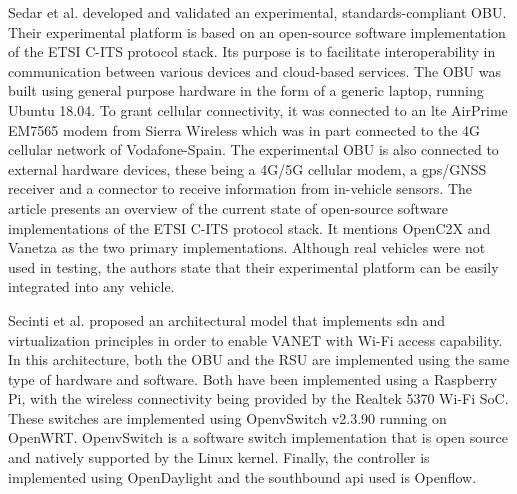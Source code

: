      
    Sedar et al.\cite{sedar_standards-compliant_2021} developed and validated an experimental, standards-compliant OBU. Their experimental platform is based on an open-source software implementation of the ETSI C-ITS protocol stack. Its purpose is to facilitate interoperability in communication between various devices and cloud-based services.
    The OBU was built using general purpose hardware in the form of a generic laptop, running Ubuntu 18.04. To grant cellular connectivity, it was connected to an \gls{lte} AirPrime EM7565 modem from Sierra Wireless which was in part connected to the 4G cellular network of Vodafone-Spain. The experimental OBU is also connected to external hardware devices, these being a 4G/5G cellular modem, a \gls{gps}/GNSS receiver and a connector to receive information from in-vehicle sensors.
    The article presents an overview of the current state of open-source software implementations of the ETSI C-ITS protocol stack. It mentions OpenC2X and Vanetza as the two primary implementations. 
    Although real vehicles were not used in testing, the authors state that their experimental platform can be easily integrated into any vehicle.
    
    
    Secinti et al.\cite{secinti_software_2017} proposed an architectural model that implements \gls{sdn} and virtualization principles in order to enable VANET with Wi-Fi access capability. 
    In this architecture, both the OBU and the RSU are implemented using the same type of hardware and software. Both have been implemented using a Raspberry Pi, with the wireless connectivity being provided by the Realtek 5370 Wi-Fi SoC.
    These switches are implemented using OpenvSwitch v2.3.90 running on OpenWRT. OpenvSwitch is a software switch implementation that is open source and natively supported by the Linux kernel\cite{noauthor_open_nodate-2}. Finally, the controller is implemented using OpenDaylight and the southbound \gls{api} used is Openflow.
    
